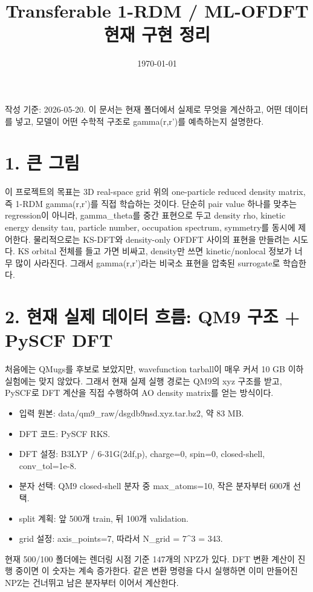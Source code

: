 \documentclass[11pt]{article}
\title{Transferable 1-RDM / ML-OFDFT 현재 구현 정리}
\author{}
\date{\today}
\begin{document}
\maketitle
작성 기준: 2026-05-20. 이 문서는 현재 폴더에서 실제로 무엇을 계산하고, 어떤 데이터를 넣고, 모델이 어떤 수학적 구조로 gamma(r,r')를 예측하는지 설명한다.
\section*{1. 큰 그림}
이 프로젝트의 목표는 3D real-space grid 위의 one-particle reduced density matrix, 즉 1-RDM gamma(r,r')를 직접 학습하는 것이다. 단순히 pair value 하나를 맞추는 regression이 아니라, gamma\_theta를 중간 표현으로 두고 density rho, kinetic energy density tau, particle number, occupation spectrum, symmetry를 동시에 제어한다.
물리적으로는 KS-DFT와 density-only OFDFT 사이의 표현을 만들려는 시도다. KS orbital 전체를 들고 가면 비싸고, density만 쓰면 kinetic/nonlocal 정보가 너무 많이 사라진다. 그래서 gamma(r,r')라는 비국소 표현을 압축된 surrogate로 학습한다.
\section*{2. 현재 실제 데이터 흐름: QM9 구조 + PySCF DFT}
처음에는 QMugs를 후보로 보았지만, wavefunction tarball이 매우 커서 10 GB 이하 실험에는 맞지 않았다. 그래서 현재 실제 실행 경로는 QM9의 xyz 구조를 받고, PySCF로 DFT 계산을 직접 수행하여 AO density matrix를 얻는 방식이다.
\begin{itemize}[leftmargin=1.5em]
\item 입력 원본: data/qm9\_raw/dsgdb9nsd.xyz.tar.bz2, 약 83 MB.
\item DFT 코드: PySCF RKS.
\item DFT 설정: B3LYP / 6-31G(2df,p), charge=0, spin=0, closed-shell, conv\_tol=1e-8.
\item 분자 선택: QM9 closed-shell 분자 중 max\_atoms=10, 작은 분자부터 600개 선택.
\item split 계획: 앞 500개 train, 뒤 100개 validation.
\item grid 설정: axis\_points=7, 따라서 N\_grid = 7^3 = 343.
\end{itemize}
현재 500/100 폴더에는 렌더링 시점 기준 147개의 NPZ가 있다. DFT 변환 계산이 진행 중이면 이 숫자는 계속 증가한다. 같은 변환 명령을 다시 실행하면 이미 만들어진 NPZ는 건너뛰고 남은 분자부터 이어서 계산한다.
\end{document}
